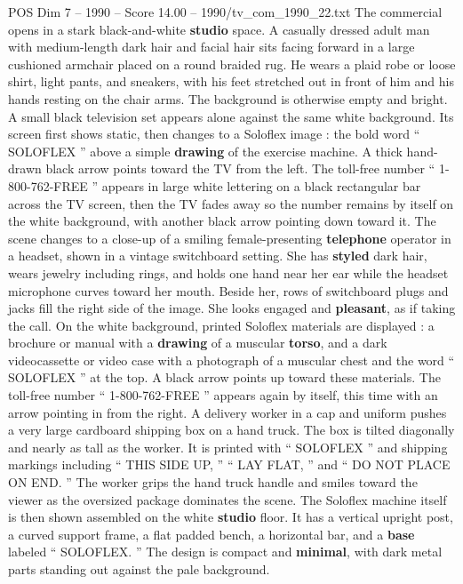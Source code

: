 \begin{textsample}{POS Dim 7 – 1990 – Score 14.00 – 1990/tv\_com\_1990\_22.txt}  \label{ex:f7_pos_061}
The commercial opens in a stark black-and-white \textbf{studio} space.
A casually dressed adult man with medium-length dark hair and facial hair sits facing forward in a large cushioned armchair placed on a round braided rug.
He wears a plaid robe or loose shirt, light pants, and sneakers, with his feet stretched out in front of him and his hands resting on the chair arms.
The background is otherwise empty and bright.
A small black television set appears alone against the same white background.
Its screen first shows static, then changes to a Soloflex image : the bold word “ SOLOFLEX ” above a simple \textbf{drawing} of the exercise machine.
A thick hand-drawn black arrow points toward the TV from the left.
The toll-free number “ 1-800-762-FREE ” appears in large white lettering on a black rectangular bar across the TV screen, then the TV fades away so the number remains by itself on the white background, with another black arrow pointing down toward it.
The scene changes to a close-up of a smiling female-presenting \textbf{telephone} operator in a headset, shown in a vintage switchboard setting.
She has \textbf{styled} dark hair, wears jewelry including rings, and holds one hand near her ear while the headset microphone curves toward her mouth.
Beside her, rows of switchboard plugs and jacks fill the right side of the image.
She looks engaged and \textbf{pleasant}, as if taking the call.
On the white background, printed Soloflex materials are displayed : a brochure or manual with a \textbf{drawing} of a muscular \textbf{torso}, and a dark videocassette or video case with a photograph of a muscular chest and the word “ SOLOFLEX ” at the top.
A black arrow points up toward these materials.
The toll-free number “ 1-800-762-FREE ” appears again by itself, this time with an arrow pointing in from the right.
A delivery worker in a cap and uniform pushes a very large cardboard shipping box on a hand truck.
The box is tilted diagonally and nearly as tall as the worker.
It is printed with “ SOLOFLEX ” and shipping markings including “ THIS SIDE UP, ” “ LAY FLAT, ” and “ DO NOT PLACE ON END. ” The worker grips the hand truck handle and smiles toward the viewer as the oversized package dominates the scene.
The Soloflex machine itself is then shown assembled on the white \textbf{studio} floor.
It has a vertical upright post, a curved support frame, a flat padded bench, a horizontal bar, and a \textbf{base} labeled “ SOLOFLEX. ” The design is compact and \textbf{minimal}, with dark metal parts standing out against the pale background.

\end{textsample}
